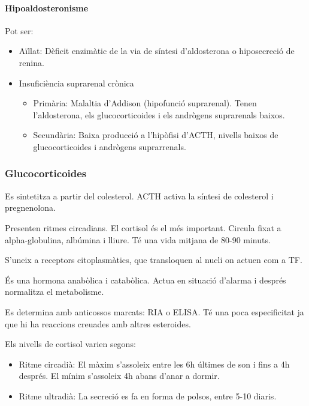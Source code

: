 \paragraph{Hipoaldosteronisme}
Pot ser:
\begin{itemize}
\item Aïllat: Dèficit enzimàtic de la via de síntesi d'aldosterona o
  hiposecreció de renina.

\item Insuficiència suprarenal crònica
  \begin{itemize}
  \item Primària: Malaltia d'Addison (hipofunció suprarenal). Tenen
    l'aldosterona, els glucocorticoides i els andrògens suprarenals
    baixos.

  \item Secundària: Baixa producció a l'hipòfisi d'ACTH, nivells
    baixos de glucocorticoides i andrògens suprarrenals.
  \end{itemize}
\end{itemize}

\subsubsection{Glucocorticoides}
\label{sec:glucocorticoides}
Es sintetitza a partir del colesterol. ACTH activa la síntesi de
colesterol i pregnenolona.

Presenten ritmes circadians. El cortisol és el més important. Circula
fixat a alpha-globulina, albúmina i lliure. Té una vida mitjana de
80-90 minuts.

S'uneix a receptors citoplasmàtics, que transloquen al nucli on actuen
com a TF.


És una hormona anabòlica i catabòlica. Actua en situació d'alarma i
després normalitza el metabolisme.

Es determina amb anticossos marcats: RIA o ELISA. Té una poca
especificitat ja que hi ha reaccions creuades amb altres esteroides. 

Els nivells de cortisol varien segons:
\begin{itemize}
\item Ritme circadià: El màxim s'assoleix entre les 6h últimes de son
  i fins a 4h després. El mínim s'assoleix 4h abans d'anar a dormir.

\item Ritme ultradià: La secreció es fa en forma de polsos, entre 5-10 diaris.
\end{itemize}

